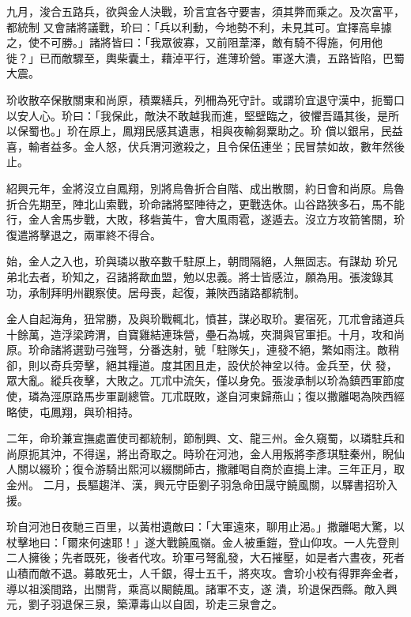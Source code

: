 \begin{pinyinscope}
 九月，浚合五路兵，欲與金人決戰，玠言宜各守要害，須其弊而乘之。及次富平，都統制
 又會諸將議戰，玠曰：「兵以利動，今地勢不利，未見其可。宜擇高阜據之，使不可勝。」諸將皆曰：「我眾彼寡，又前阻葦澤，敵有騎不得施，何用他徙？」已而敵驟至，輿柴囊土，藉淖平行，進薄玠營。軍遂大潰，五路皆陷，巴蜀大震。



 玠收散卒保散關東和尚原，積粟繕兵，列柵為死守計。或謂玠宜退守漢中，扼蜀口以安人心。玠曰：「我保此，敵決不敢越我而進，堅壁臨之，彼懼吾躡其後，是所以保蜀也。」玠在原上，鳳翔民感其遺惠，相與夜輸芻粟助之。玠
 償以銀帛，民益喜，輸者益多。金人怒，伏兵渭河邀殺之，且令保伍連坐；民冒禁如故，數年然後止。



 紹興元年，金將沒立自鳳翔，別將烏魯折合自階、成出散關，約日會和尚原。烏魯折合先期至，陣北山索戰，玠命諸將堅陣待之，更戰迭休。山谷路狹多石，馬不能行，金人舍馬步戰，大敗，移砦黃牛，會大風雨雹，遂遁去。沒立方攻箭筈關，玠復遣將擊退之，兩軍終不得合。



 始，金人之入也，玠與璘以散卒數千駐原上，朝問隔絕，人無固志。有謀劫
 玠兄弟北去者，玠知之，召諸將歃血盟，勉以忠義。將士皆感泣，願為用。張浚錄其功，承制拜明州觀察使。居母喪，起復，兼陜西諸路都統制。



 金人自起海角，狃常勝，及與玠戰輒北，憤甚，謀必取玠。婁宿死，兀朮會諸道兵十餘萬，造浮梁跨渭，自寶雞結連珠營，壘石為城，夾澗與官軍拒。十月，攻和尚原。玠命諸將選勁弓強弩，分番迭射，號「駐隊矢」，連發不絕，繁如雨注。敵稍卻，則以奇兵旁擊，絕其糧道。度其困且走，設伏於神坌以待。金兵至，伏
 發，眾大亂。縱兵夜擊，大敗之。兀朮中流矢，僅以身免。張浚承制以玠為鎮西軍節度使，璘為涇原路馬步軍副總管。兀朮既敗，遂自河東歸燕山；復以撒離喝為陜西經略使，屯鳳翔，與玠相持。



 二年，命玠兼宣撫處置使司都統制，節制興、文、龍三州。金久窺蜀，以璘駐兵和尚原扼其沖，不得逞，將出奇取之。時玠在河池，金人用叛將李彥琪駐秦州，睨仙人關以綴玠；復令游騎出熙河以綴關師古，撒離喝自商於直搗上津。三年正月，取金州。
 二月，長驅趨洋、漢，興元守臣劉子羽急命田晟守饒風關，以驛書招玠入援。



 玠自河池日夜馳三百里，以黃柑遺敵曰：「大軍遠來，聊用止渴。」撒離喝大驚，以杖擊地曰：「爾來何速耶！」遂大戰饒風嶺。金人被重鎧，登山仰攻。一人先登則二人擁後；先者既死，後者代攻。玠軍弓弩亂發，大石摧壓，如是者六晝夜，死者山積而敵不退。募敢死士，人千銀，得士五千，將夾攻。會玠小校有得罪奔金者，導以祖溪間路，出關背，乘高以闞饒風。諸軍不支，遂
 潰，玠退保西縣。敵入興元，劉子羽退保三泉，築潭毒山以自固，玠走三泉會之。




\end{pinyinscope}
